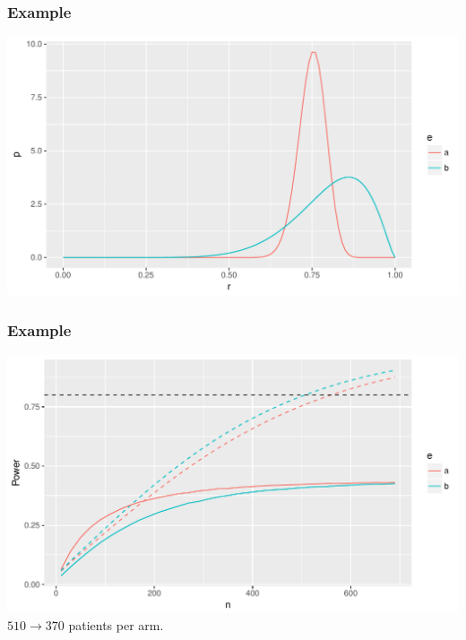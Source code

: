 \documentclass{beamer}
\begin{document}
\begin{frame}
\frametitle{Example}
\centering
\includegraphics[scale=0.6]{endpoints2}
\end{frame}

\begin{frame}
\frametitle{Example}
\centering
\includegraphics[scale=0.6]{endpoints3}
\vspace{1mm}
$510 \rightarrow 370$ patients per arm.
\end{frame}

\frame[allowframebreaks]{
\tiny
\printbibliography
}
\end{document}
